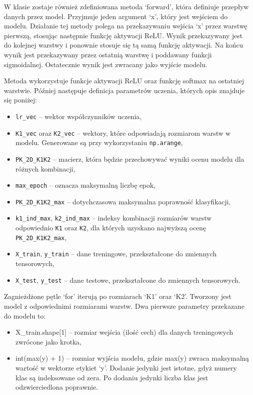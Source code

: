 \documentclass{article}
\begin{document}
W klasie zostaje również zdefiniowana metoda `forward', która definiuje przepływ danych przez model.
Przyjmuje jeden argument `x', który jest wejściem do modelu.
Działanie tej metody polega na przekazywaniu wejścia `x' przez warstwę pierwszą, stosując następnie funkcję aktywacji ReLU.
Wynik przekazywany jest do kolejnej warstwy i ponownie stosuje się tą samą funkcję aktywacji.
Na końcu wynik jest przekazywany przez ostatnią warstwę i poddawany funkcji sigmoidalnej.
Ostatecznie wynik jest zwracany jako wyjście modelu.

Metoda wykorzystuje funkcje aktywacji ReLU oraz funkcję softmax na ostatniej warstwie.
Później następuje definicja parametrów uczenia, których opis znajduje się poniżej:
\begin{itemize}
    \item \texttt{lr\_vec} -- wektor współczynników uczenia,
    \item \texttt{K1\_vec} oraz \texttt{K2\_vec} -- wektory, które odpowiadają rozmiarom warstw w modelu. Generowane są przy wykorzystaniu \texttt{np.arange},
    \item \texttt{PK\_2D\_K1K2} -- macierz, która będzie przechowywać wyniki ocenu modelu dla różnych kombinacji,
    \item \texttt{max\_epoch} -- oznacza maksymalną liczbę epok,
    \item \texttt{PK\_2D\_K1K2\_max} -- dotychczasowa maksymalna poprawność klasyfikacji,
    \item \texttt{k1\_ind\_max}, \texttt{k2\_ind\_max} -- indeksy kombinacji rozmiarów warstw odpowiednio \texttt{K1} oraz \texttt{K2}, dla których uzyskano najwyższą ocenę \texttt{PK\_2D\_K1K2\_max},
    \item \texttt{X\_train}, \texttt{y\_train} -- dane treningowe, przekształcone do zmiennych tensorowych,
    \item \texttt{X\_test}, \texttt{y\_test} -- dane testowe, przekształcone do zmiennych tensorowych.
\end{itemize}

Zagnieżdżone pętle `for' iterują po rozmiarach `K1' oraz `K2'.
Tworzony jest model z odpowiednimi rozmiarami warstw.
Dwa pierwsze parametry przekazane do modelu to:
\begin{itemize}
    \item X\_train.shape[1] -- rozmiar wejścia (ilość cech) dla danych treningowych zwrócone jako krotka,
    \item int(max(y) + 1) -- rozmiar wyjścia modelu, gdzie max(y) zwraca maksymalną wartość w wektorze etykiet `y'. Dodanie jedynki jest istotne, gdyż numery klas są indeksowane od zera. Po dodaniu jedynki liczba klas jest odzwierciedlona poprawnie.
\end{itemize}
\end{document}
